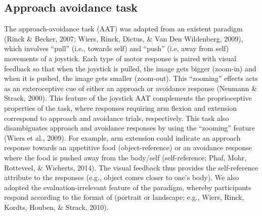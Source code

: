 \documentclass[man,floatsintext]{apa6}
\begin{document}
\hypertarget{aat}{%
\subsection{Approach avoidance task}\label{aat}}

\par

The approach-avoidance task (AAT) was adapted from an existent paradigm (Rinck \& Becker, 2007; Wiers, Rinck, Dictus, \& Van Den Wildenberg, 2009), which involves \enquote{pull} (i.e., towards self) and \enquote{push} (i.e, away from self) movements of a joystick. Each type of motor response is paired with visual feedback so that when the joystick is pulled, the image gets bigger (zoom-in) and when it is pushed, the image gets smaller (zoom-out). This \enquote{zooming} effects acts as an exteroceptive cue of either an approach or avoidance response (Neumann \& Strack, 2000). This feature of the joystick AAT complements the proprioceptive properties of the task, where responses requiring arm flexion and extension correspond to approach and avoidance trials, respectively. This task also disambiguates approach and avoidance responses by using the \enquote{zooming} feature (Wiers et al., 2009). For example, arm extension could indicate an approach response towards an appetitive food (object-reference) or an avoidance response where the food is pushed away from the body/self (self-reference; Phaf, Mohr, Rotteveel, \& Wicherts, 2014). The visual feedback thus provides the self-reference attribute to the responses (e.g., object comes closer to one's body). We also adopted the evaluation-irrelevant feature of the paradigm, whereby participants respond according to the format of (portrait or landscape; e.g., Wiers, Rinck, Kordts, Houben, \& Strack, 2010).

\par
\end{document}
